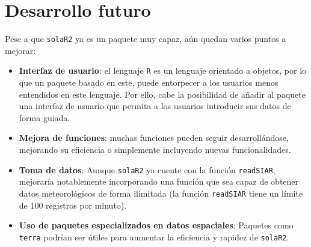 \FloatBarrier

\section{Desarrollo futuro}
\label{sec:org29b2c12}
Pese a que \texttt{solaR2} ya es un paquete muy capaz, aún quedan varios puntos a mejorar:
\begin{itemize}
\item \textbf{Interfaz de usuario}: el lenguaje \texttt{R} es un lenguaje orientado a objetos, por lo que un paquete basado en este, puede entorpecer a los usuarios menos entendidos en este lenguaje. Por ello, cabe la posibilidad de añadir al paquete una interfaz de usuario que permita a los usuarios introducir sus datos de forma guiada.
\item \textbf{Mejora de funciones}: muchas funciones pueden seguir desarrollándose, mejorando su eficiencia o simplemente incluyendo nuevas funcionalidades.
\item \textbf{Toma de datos}: Aunque \texttt{solaR2} ya cuente con la función \texttt{readSIAR}, mejoraría notablemente incorporando una función que sea capaz de obtener datos meteorológicos de forma ilimitada (la función \texttt{readSIAR} tiene un límite de 100 registros por minuto).
\item \textbf{Uso de paquetes especializados en datos espaciales}: Paquetes como \texttt{terra} \cite{hijmans24} podrían ser útiles para aumentar la eficiencia y rapidez de \texttt{solaR2}.
\end{itemize}
